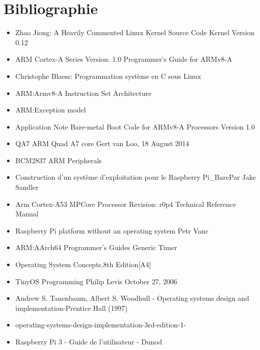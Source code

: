 \documentclass[12pt,a4paper,oneside]{book}
\begin{document}
\chapter{Bibliographie}
\begin{itemize}
\item Zhao Jiong: A Heavily Commented Linux Kernel Source Code Kernel Version 0.12\\
\item ARM Cortex-A Series Version: 1.0 Programmer’s Guide for ARMv8-A\\
\item Christophe Blaess: Programmation système en C sous Linux\\
\item ARM:Armv8-A Instruction Set Architecture\\
\item ARM:Exception model\\
\item Application Note Bare-metal Boot Code for ARMv8-A Processors Version 1.0\\
\item QA7 ARM Quad A7 core Gert van Loo, 18 August 2014\\
\item BCM2837 ARM Peripherals\\
\item Construction d'un système d'exploitation pour le Raspberry Pi\_BarePar Jake Sandler\\
\item Arm Cortex-A53 MPCore Processor Revision: r0p4 Technical Reference Manual\\
\item Raspberry Pi platform without an operating system Petr Vanc \\
\item ARM:AArch64 Programmer's Guides Generic Timer\\
\item Operating System Concepts,8th Edition[A4]\\
\item TinyOS Programming Philip Levis October 27, 2006\\
\item Andrew S. Tanenbaum, Albert S. Woodhull - Operating systems design and implementation-Prentice Hall (1997)\\
\item operating-systems-design-implementation-3rd-edition-1-\\
\item Raspberry Pi 3 - Guide de l'utilisateur - Dunod\\
\end{itemize}
\end{document}
